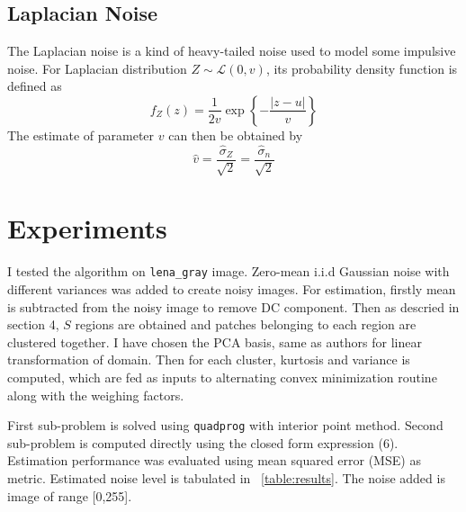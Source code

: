 \documentclass[11pt]{article}
\begin{document}
\subsection{Laplacian Noise}
The Laplacian noise is a kind of heavy-tailed noise used to model some impulsive noise. For Laplacian distribution $Z \sim \mathcal{L}(0, v)$, its probability density function is defined as
$$f _ { Z } ( z ) = \frac { 1 } { 2 v } \exp \left\{ - \frac { | z - u | } { v } \right\}$$
The estimate of parameter $v$ can then be obtained by
$$\hat { v } = \frac { \hat { \sigma } _ { Z } } { \sqrt { 2 } } = \frac { \hat { \sigma } _ { n } } { \sqrt { 2 } }$$

\section{Experiments}
I tested the algorithm on \texttt{lena\_gray} image. Zero-mean i.i.d Gaussian noise with different variances was added to create noisy images.  For estimation, firstly mean is subtracted from the noisy image to remove DC component. Then as descried in section 4, $S$ regions are obtained and patches belonging to each region are clustered together. I have chosen the PCA basis, same as authors for linear transformation of domain. Then for each cluster, kurtosis and variance is computed, which are fed as inputs to alternating convex minimization routine along with the weighing factors.

First sub-problem is solved using \texttt{quadprog} with interior point method. Second sub-problem is computed directly using the closed form expression (6).  Estimation performance was evaluated using mean squared error (MSE) as metric. Estimated noise level is tabulated in ~\ref{table:results}. The noise added is image of range [0,255].
\end{document}
